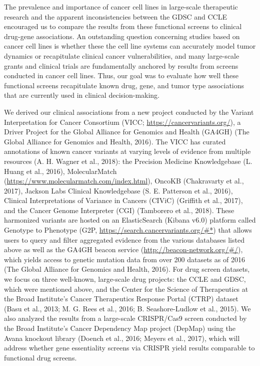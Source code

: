 \documentclass[man]{apa6}
\begin{document}
The prevalence and importance of cancer cell lines in large-scale
therapeutic research and the apparent inconsistencies between the GDSC
and CCLE encouraged us to compare the results from these functional
screens to clinical drug-gene associations. An outstanding question
concerning studies based on cancer cell lines is whether these the cell
line systems can accurately model tumor dynamics or recapitulate
clinical cancer vulnerabilities, and many large-scale grants and
clinical trials are fundamentally anchored by results from screens
conducted in cancer cell lines. Thus, our goal was to evaluate how well
these functional screens recapitulate known drug, gene, and tumor type
associations that are currently used in clinical decision-making.

We derived our clinical associations from a new project conducted by the
Variant Interpretation for Cancer Consortium (VICC;
\url{https://cancervariants.org/}), a Driver Project for the Global
Alliance for Genomics and Health (GA4GH) (The Global Alliance for
Genomics and Health, 2016). The VICC has curated annotations of known
cancer variants at varying levels of evidence from multiple resources
(A. H. Wagner et al., 2018): the Precision Medicine Knowledgebase (L.
Huang et al., 2016), MolecularMatch
(\url{https://www.molecularmatch.com/index.html}), OncoKB (Chakravarty
et al., 2017), Jackson Labs Clinical Knowledgebase (S. E. Patterson et
al., 2016), Clinical Interpretations of Variance in Cancers (CIViC)
(Griffith et al., 2017), and the Cancer Genome Interpreter (CGI)
(Tamborero et al., 2018). These harmonized variants are hosted on an
ElasticSearch (Kibana v6.0) platform called Genotype to Phenotype (G2P,
\url{https://search.cancervariants.org/\#*}) that allows users to query
and filter aggregated evidence from the various databases listed above
as well as the GA4GH beacon service
(\url{http://beacon-network.org/\#/}), which yields access to genetic
mutation data from over 200 datasets as of 2016 (The Global Alliance for
Genomics and Health, 2016). For drug screen datasets, we focus on three
well-known, large-scale drug projects: the CCLE and GDSC, which were
mentioned above, and the Center for the Science of Therapeutics at the
Broad Institute's Cancer Therapeutics Response Portal (CTRP) dataset
(Basu et al., 2013; M. G. Rees et al., 2016; B. Seashore-Ludlow et al.,
2015). We also analyzed the results from a large-scale CRISPR/Cas9
screen conducted by the Broad Institute's Cancer Dependency Map project
(DepMap) using the Avana knockout library (Doench et al., 2016; Meyers
et al., 2017), which will address whether gene essentiality screens via
CRISPR yield results comparable to functional drug screens.
\end{document}
